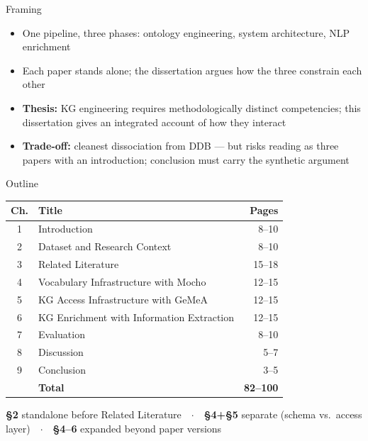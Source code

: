 \documentclass[xcolor,aspectratio=169,compress]{beamer}
\begin{document}
\begin{frame}{Framing}
  \small
  \begin{itemize}\setlength{\itemsep}{6pt}
    \item One pipeline, three phases: ontology engineering, system architecture, NLP enrichment
    \item Each paper stands alone; the dissertation argues how the three constrain each other
    \item \textbf{Thesis:} KG engineering requires methodologically distinct competencies;
          this dissertation gives an integrated account of how they interact
    \item \textbf{Trade-off:} cleanest dissociation from DDB --- but risks reading as three
          papers with an introduction; conclusion must carry the synthetic argument
  \end{itemize}
\end{frame}

\begin{frame}{Outline}
  \footnotesize
  \begin{tabular}{clr}
    \toprule
    Ch. & Title & Pages \\
    \midrule
    1 & Introduction                                  & 8--10 \\
    2 & Dataset and Research Context                  & 8--10 \\
    3 & Related Literature                            & 15--18 \\
    4 & Vocabulary Infrastructure with Mocho          & 12--15 \\
    5 & KG Access Infrastructure with GeMeA           & 12--15 \\
    6 & KG Enrichment with Information Extraction     & 12--15 \\
    7 & Evaluation                                    & 8--10 \\
    8 & Discussion                                    & 5--7  \\
    9 & Conclusion                                    & 3--5  \\
    \midrule
      & \textbf{Total}                                & \textbf{82--100} \\
    \bottomrule
  \end{tabular}
  \smallskip

  \footnotesize
  \textbf{§2} standalone before Related Literature\ \ $\cdot$\ \
  \textbf{§4+§5} separate (schema vs.\ access layer)\ \ $\cdot$\ \
  \textbf{§4--6} expanded beyond paper versions
\end{frame}
\end{document}
